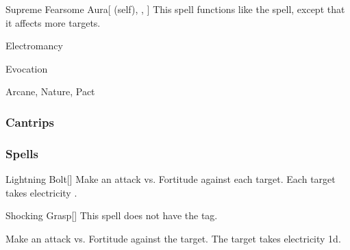 \lowercase{\hypertarget{spell:Supreme Fearsome Aura}{}}\label{spell:Supreme Fearsome Aura}
\begin{attuneability}[Rank 7]{\hypertarget{spell:Supreme Fearsome Aura}{Supreme Fearsome Aura}}[ (self), , ]
This spell functions like the  spell, except that it affects more targets.
\end{attuneability}
\vspace{0.25em}


\newpage
\begin{spellsection}{Electromancy}

\begin{spellheader}
\end{spellheader}


 Evocation

 Arcane, Nature, Pact

\subsubsection{Cantrips}


\end{spellsection}


\subsubsection{Spells}


\lowercase{\hypertarget{spell:Lightning Bolt}{}}\label{spell:Lightning Bolt}
\begin{freeability}[Rank 1]{\hypertarget{spell:Lightning Bolt}{Lightning Bolt}}[]
Make an attack vs. Fortitude against each target.
\hit Each target takes electricity .
\end{freeability}
\vspace{0.25em}



\lowercase{\hypertarget{spell:Shocking Grasp}{}}\label{spell:Shocking Grasp}
\begin{freeability}[Rank 1]{\hypertarget{spell:Shocking Grasp}{Shocking Grasp}}[]
This spell does not have the  tag.

Make an attack vs. Fortitude against the target.
\hit The target takes electricity  \plus1d.
\end{freeability}
\vspace{0.25em}




